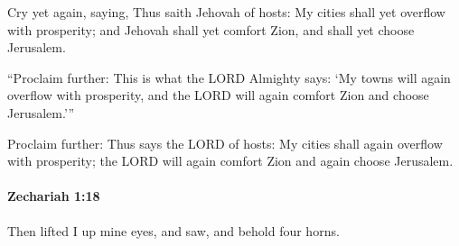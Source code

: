 			\begin{versebox}
					\item[BHS] 
					\item[LXX] 
					\item[ASV] Cry yet again, saying, Thus saith Jehovah of hosts: My cities shall yet overflow with prosperity; and Jehovah shall yet comfort Zion, and shall yet choose Jerusalem.
					\item[NIV] “Proclaim further: This is what the LORD Almighty says: ‘My towns will again overflow with prosperity, and the LORD will again comfort Zion and choose Jerusalem.’”
					\item[NRSV] Proclaim further: Thus says the LORD of hosts: My cities shall again overflow with prosperity; the LORD will again comfort Zion and again choose Jerusalem.
			\end{versebox}

		\paragraph{Zechariah 1:18} %
			\label{ZECHARIAH-1-18}

			Then lifted I up mine eyes, and saw, and behold four horns.

